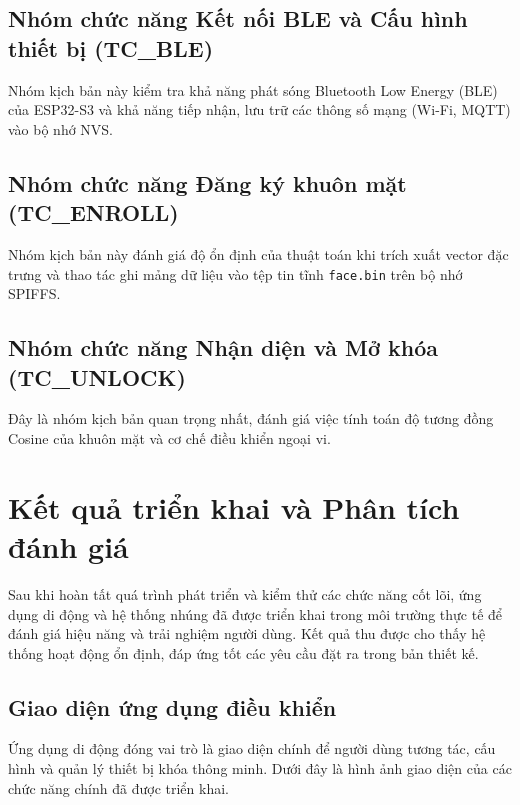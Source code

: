 \subsection{Nhóm chức năng Kết nối BLE và Cấu hình thiết bị (TC\_BLE)}

Nhóm kịch bản này kiểm tra khả năng phát sóng Bluetooth Low Energy (BLE) của ESP32-S3 và khả năng tiếp nhận, lưu trữ các thông số mạng (Wi-Fi, MQTT) vào bộ nhớ NVS.



\subsection{Nhóm chức năng Đăng ký khuôn mặt (TC\_ENROLL)}

Nhóm kịch bản này đánh giá độ ổn định của thuật toán khi trích xuất vector đặc trưng và thao tác ghi mảng dữ liệu vào tệp tin tĩnh \texttt{face.bin} trên bộ nhớ SPIFFS.



\subsection{Nhóm chức năng Nhận diện và Mở khóa (TC\_UNLOCK)}

Đây là nhóm kịch bản quan trọng nhất, đánh giá việc tính toán độ tương đồng Cosine của khuôn mặt và cơ chế điều khiển ngoại vi.



\section{Kết quả triển khai và Phân tích đánh giá}
\label{sec:ket-qua-danh-gia}

Sau khi hoàn tất quá trình phát triển và kiểm thử các chức năng cốt lõi, ứng dụng di động và hệ thống nhúng đã được triển khai trong môi trường thực tế để đánh giá hiệu năng và trải nghiệm người dùng. Kết quả thu được cho thấy hệ thống hoạt động ổn định, đáp ứng tốt các yêu cầu đặt ra trong bản thiết kế.

\subsection{Giao diện ứng dụng điều khiển}

Ứng dụng di động đóng vai trò là giao diện chính để người dùng tương tác, cấu hình và quản lý thiết bị khóa thông minh. Dưới đây là hình ảnh giao diện của các chức năng chính đã được triển khai.

